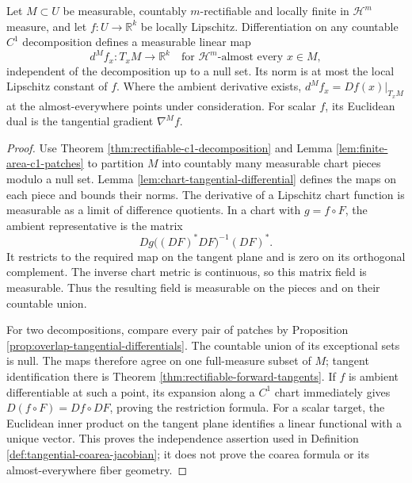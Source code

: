 \begin{theorem}\label{thm:rectifiable-tangential-differential}
Let $M\subset U$ be measurable, countably $m$-rectifiable and locally finite in $\mathcal H^m$ measure, and let $f:U\to\mathbb R^k$ be locally Lipschitz. Differentiation on any countable $C^1$ decomposition defines a measurable linear map
\[
 d^Mf_x:T_xM\to\mathbb R^k
 \quad\text{for }\mathcal H^m\text{-almost every }x\in M,
\]
independent of the decomposition up to a null set. Its norm is at most the local Lipschitz constant of $f$. Where the ambient derivative exists, $d^Mf_x=Df(x)|_{T_xM}$ at the almost-everywhere points under consideration. For scalar $f$, its Euclidean dual is the tangential gradient $\nabla^Mf$.
\end{theorem}
\begin{proof}
Use Theorem \ref{thm:rectifiable-c1-decomposition} and Lemma \ref{lem:finite-area-c1-patches} to partition $M$ into countably many measurable chart pieces modulo a null set. Lemma \ref{lem:chart-tangential-differential} defines the maps on each piece and bounds their norms. The derivative of a Lipschitz chart function is measurable as a limit of difference quotients. In a chart with $g=f\circ F$, the ambient representative is the matrix
\[
 Dg\bigl((DF)^*DF\bigr)^{-1}(DF)^*.
\]
It restricts to the required map on the tangent plane and is zero on its orthogonal complement. The inverse chart metric is continuous, so this matrix field is measurable. Thus the resulting field is measurable on the pieces and on their countable union.

For two decompositions, compare every pair of patches by Proposition \ref{prop:overlap-tangential-differentials}. The countable union of its exceptional sets is null. The maps therefore agree on one full-measure subset of $M$; tangent identification there is Theorem \ref{thm:rectifiable-forward-tangents}. If $f$ is ambient differentiable at such a point, its expansion along a $C^1$ chart immediately gives $D(f\circ F)=Df\circ DF$, proving the restriction formula. For a scalar target, the Euclidean inner product on the tangent plane identifies a linear functional with a unique vector. This proves the independence assertion used in Definition \ref{def:tangential-coarea-jacobian}; it does not prove the coarea formula or its almost-everywhere fiber geometry.
\end{proof}
